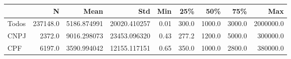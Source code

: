\begin{tabular}{lrrrrrrrr}
\toprule
{} &         N &         Mean &           Std &   Min &    25\% &     50\% &     75\% &        Max \\
\midrule
Todos &  237148.0 &  5186.874991 &  20020.410257 &  0.01 &  300.0 &  1000.0 &  3000.0 &  2000000.0 \\
CNPJ  &    2372.0 &  9016.298073 &  23453.096320 &  0.43 &  277.2 &  1200.0 &  5000.0 &   300000.0 \\
CPF   &    6197.0 &  3590.994042 &  12155.117151 &  0.65 &  350.0 &  1000.0 &  2800.0 &   380000.0 \\
\bottomrule
\end{tabular}
